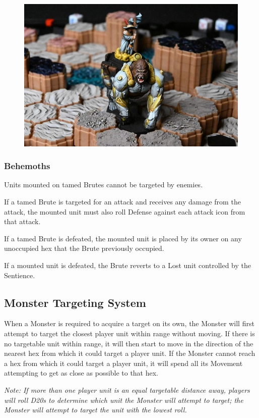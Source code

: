 \documentclass[../main.tex]{subfiles}
\begin{document}
\begin{figure}[h]
    \centering
    \includegraphics[width=1\linewidth]{chapters//Monsters/TimeStrikeTamedBrute.jpg}
\end{figure}

\subsubsection{Behemoths}
Units mounted on tamed Brutes cannot be targeted by enemies.

If a tamed Brute is targeted for an attack and receives any damage from the attack, the mounted unit must also roll Defense against each attack icon from that attack.

If a tamed Brute is defeated, the mounted unit is placed by its owner on any unoccupied hex that the Brute previously occupied.

If a mounted unit is defeated, the Brute reverts to a Lost unit controlled by the Sentience.

\subsection{Monster Targeting System}
When a Monster is required to acquire a target on its own, the Monster will first attempt to target the closest player unit within range without moving. If there is no targetable unit within range, it will then start to move in the direction of the nearest hex from which it could target a player unit. If the Monster cannot reach a hex from which it could target a player unit, it will spend all its Movement attempting to get as close as possible to that hex.

\textit{Note: If more than one player unit is an equal targetable distance away, players will roll D20s to determine which unit the Monster will attempt to target; the Monster will attempt to target the unit with the lowest roll.}

\clearpage
\end{document}
